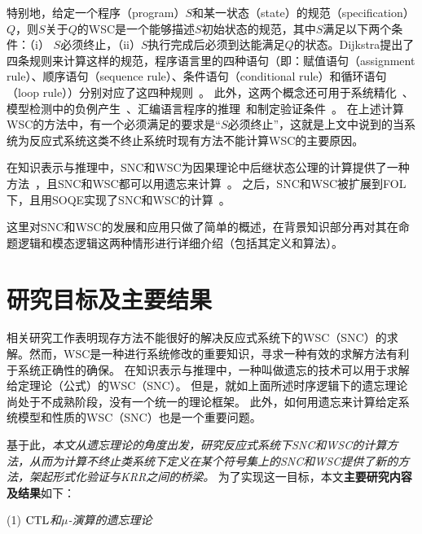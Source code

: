 特别地，给定一个程序（program）$S$和某一状态（state）的规范（specification）$Q$，则$S$关于$Q$的WSC是一个能够描述$S$初始状态的规范，其中$S$满足以下两个条件：（i） $S$必须终止，（ii）$S$执行完成后必须到达能满足$Q$的状态。Dijkstra提出了四条规则来计算这样的规范，程序语言里的四种语句（即：赋值语句（assignment rule）、顺序语句（sequence rule）、条件语句（conditional rule）和循环语句（loop rule））分别对应了这四种规则~\cite{DBLP:journals/cacm/Dijkstra75}。
此外，这两个概念还可用于系统精化~\cite{woodcock1990refinement}、模型检测中的负例产生~\cite{dailler2018instrumenting}、汇编语言程序的推理~\cite{legato2002weakest}和制定验证条件~\cite{DBLP:journals/ipl/Leino05}。
在上述计算WSC的方法中，有一个必须满足的要求是“$S$必须终止”，这就是上文中说到的当系统为反应式系统这类不终止系统时现有方法不能计算WSC的主要原因。


在知识表示与推理中，SNC和WSC为因果理论中后继状态公理的计算提供了一种方法~\cite{lin2003compiling}，且SNC和WSC都可以用遗忘来计算~\cite{DBLP:Lin:AIJ:2001,DBLP:conf/ijcai/DohertyLS01}。
之后，SNC和WSC被扩展到FOL下，且用SOQE实现了SNC和WSC的计算~\cite{DBLP:conf/ijcai/DohertyLS01}。

这里对SNC和WSC的发展和应用只做了简单的概述，在背景知识部分再对其在命题逻辑和模态逻辑这两种情形进行详细介绍（包括其定义和算法）。






\section{研究目标及主要结果}

相关研究工作表明现存方法不能很好的解决反应式系统下的WSC（SNC）的求解。然而，WSC是一种进行系统修改的重要知识，寻求一种有效的求解方法有利于系统正确性的确保。
在知识表示与推理中，一种叫做遗忘的技术可以用于求解给定理论（公式）的WSC（SNC）。
但是，就如上面所述时序逻辑下的遗忘理论尚处于不成熟阶段，没有一个统一的理论框架。
此外，如何用遗忘来计算给定系统模型和性质的WSC（SNC）也是一个重要问题。

基于此，{\em 本文从遗忘理论的角度出发，研究反应式系统下SNC和WSC的计算方法，从而为计算不终止类系统下定义在某个符号集上的SNC和WSC提供了新的方法，架起形式化验证与KRR之间的桥梁。}
为了实现这一目标，本文\textbf{主要研究内容及结果}如下：

(1) {\em $\textrm{CTL}$和$\mu$-演算的遗忘理论}

